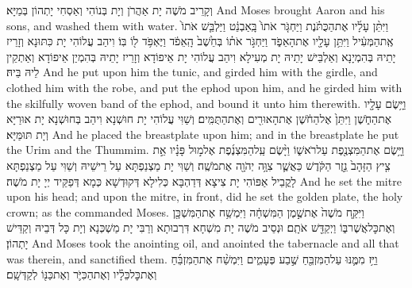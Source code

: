 {וְקָרֵיב מֹשֶׁה יָת אַהֲרֹן וְיָת בְּנוֹהִי וְאַסְחִי יָתְהוֹן בְּמַיָּא׃}
{And Moses brought Aaron and his sons, and washed them with water.}{}
{וַיִּתֵּ֨ן עָלָ֜יו אֶת\maqqaf הַכֻּתֹּ֗נֶת וַיַּחְגֹּ֤ר אֹתוֹ֙ בָּֽאַבְנֵ֔ט וַיַּלְבֵּ֤שׁ אֹתוֹ֙ אֶֽת\maqqaf הַמְּעִ֔יל וַיִּתֵּ֥ן עָלָ֖יו אֶת\maqqaf הָאֵפֹ֑ד וַיַּחְגֹּ֣ר אֹת֗וֹ בְּחֵ֙שֶׁב֙ הָֽאֵפֹ֔ד וַיֶּאְפֹּ֥ד ל֖וֹ בּֽוֹ׃}
{וִיהַב עֲלוֹהִי יָת כִּתּוּנָא וְזָרֵיז יָתֵיהּ בְּהִמְיָנָא וְאַלְבֵּישׁ יָתֵיהּ יָת מְעִילָא וִיהַב עֲלוֹהִי יָת אֵיפוֹדָא וְזָרֵיז יָתֵיהּ בְּהִמְיַן אֵיפוֹדָא וְאַתְקֵין לֵיהּ בֵּיהּ׃}
{And he put upon him the tunic, and girded him with the girdle, and clothed him with the robe, and put the ephod upon him, and he girded him with the skilfully woven band of the ephod, and bound it unto him therewith.}{}
{וַיָּ֥שֶׂם עָלָ֖יו אֶת\maqqaf הַחֹ֑שֶׁן וַיִּתֵּן֙ אֶל\maqqaf הַחֹ֔שֶׁן אֶת\maqqaf הָאוּרִ֖ים וְאֶת\maqqaf הַתֻּמִּֽים׃}
{וְשַׁוִּי עֲלוֹהִי יָת חוּשְׁנָא וִיהַב בְּחוּשְׁנָא יָת אוּרַיָּא וְיָת תּוּמַּיָּא׃}
{And he placed the breastplate upon him; and in the breastplate he put the Urim and the Thummim.}{}
{וַיָּ֥שֶׂם אֶת\maqqaf הַמִּצְנֶ֖פֶת עַל\maqqaf רֹאשׁ֑וֹ וַיָּ֨שֶׂם עַֽל\maqqaf הַמִּצְנֶ֜פֶת אֶל\maqqaf מ֣וּל פָּנָ֗יו אֵ֣ת צִ֤יץ הַזָּהָב֙ נֵ֣זֶר הַקֹּ֔דֶשׁ כַּאֲשֶׁ֛ר צִוָּ֥ה יְהֹוָ֖ה אֶת\maqqaf מֹשֶֽׁה׃}
{וְשַׁוִּי יָת מַצְנַפְתָּא עַל רֵישֵׁיהּ וְשַׁוִּי עַל מַצְנַפְתָּא לָקֳבֵיל אַפּוֹהִי יָת צִיצָא דְּדַהְבָּא כְּלִילָא דְּקוּדְשָׁא כְּמָא דְּפַקֵּיד יְיָ יָת מֹשֶׁה׃}
{And he set the mitre upon his head; and upon the mitre, in front, did he set the golden plate, the holy crown; as the \lord\space commanded Moses.}{}
{וַיִּקַּ֤ח מֹשֶׁה֙ אֶת\maqqaf שֶׁ֣מֶן הַמִּשְׁחָ֔ה וַיִּמְשַׁ֥ח אֶת\maqqaf הַמִּשְׁכָּ֖ן וְאֶת\maqqaf כׇּל\maqqaf אֲשֶׁר\maqqaf בּ֑וֹ וַיְקַדֵּ֖שׁ אֹתָֽם׃}
{וּנְסֵיב מֹשֶׁה יָת מִשְׁחָא דִּרְבוּתָא וְרַבִּי יָת מַשְׁכְּנָא וְיָת כָּל דְּבֵיהּ וְקַדֵּישׁ יָתְהוֹן׃}
{And Moses took the anointing oil, and anointed the tabernacle and all that was therein, and sanctified them.}{}
{וַיַּ֥ז מִמֶּ֛נּוּ עַל\maqqaf הַמִּזְבֵּ֖חַ שֶׁ֣בַע פְּעָמִ֑ים וַיִּמְשַׁ֨ח אֶת\maqqaf הַמִּזְבֵּ֜חַ וְאֶת\maqqaf כׇּל\maqqaf כֵּלָ֗יו וְאֶת\maqqaf הַכִּיֹּ֛ר וְאֶת\maqqaf כַּנּ֖וֹ לְקַדְּשָֽׁם׃}
